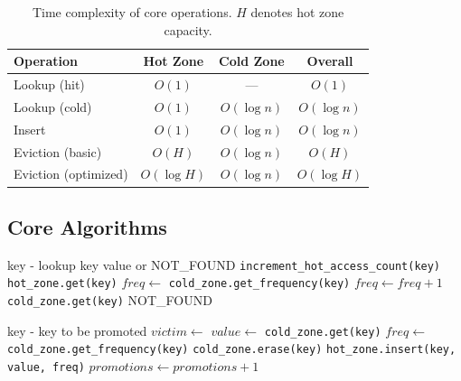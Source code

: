 \documentclass[11pt,a4paper]{article}
\begin{document}
\begin{table}[H]
\centering
\caption{Time complexity of core operations. $H$ denotes hot zone capacity.}
\label{tab:complexity}
\begin{tabular}{lccc}
\toprule
\textbf{Operation} & \textbf{Hot Zone} & \textbf{Cold Zone} & \textbf{Overall} \\
\midrule
Lookup (hit) & $O(1)$ & — & $O(1)$ \\
Lookup (cold) & $O(1)$ & $O(\log n)$ & $O(\log n)$ \\
Insert & $O(1)$ & $O(\log n)$ & $O(\log n)$ \\
Eviction (basic) & $O(H)$ & $O(\log n)$ & $O(H)$ \\
Eviction (optimized) & $O(\log H)$ & $O(\log n)$ & $O(\log H)$ \\
\bottomrule
\end{tabular}
\end{table}

\subsection{Core Algorithms}

\begin{algorithm}[H]
\caption{Lookup Operation}
\label{alg:lookup}
\begin{algorithmic}[1]
\Require key - lookup key
\Ensure value or NOT\_FOUND
    \State \texttt{increment\_hot\_access\_count(key)}
    \State \Return \texttt{hot\_zone.get(key)}
    \State $freq \gets$ \texttt{cold\_zone.get\_frequency(key)}
    \State $freq \gets freq + 1$
        \State {}
    \EndIf
    \State \Return \texttt{cold\_zone.get(key)}
\EndIf
\State \Return NOT\_FOUND
\end{algorithmic}
\end{algorithm}

\begin{algorithm}[H]
\caption{Promotion Operation}
\label{alg:promote}
\begin{algorithmic}[1]
\Require key - key to be promoted
    \State $victim \gets$ 
    \State {}
\EndIf
\State $value \gets$ \texttt{cold\_zone.get(key)}
\State $freq \gets$ \texttt{cold\_zone.get\_frequency(key)}
\State \texttt{cold\_zone.erase(key)}
\State \texttt{hot\_zone.insert(key, value, freq)}
\State $promotions \gets promotions + 1$
\end{algorithmic}
\end{algorithm}
\end{document}
